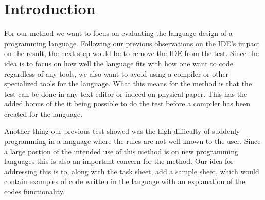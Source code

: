 \chapter{Introduction}
For our method we want to focus on evaluating the language design of a programming language.
Following our previous observations on the IDE's impact on the result, the next step would be to remove the IDE from the test.
Since the idea is to focus on how well the language fits with how one want to code regardless of any tools, we also want to avoid using a compiler or other specialized tools for the language.%
What this means for the method is that the test can be done in any text-editor or indeed on physical paper.
This has the added bonus of the it being possible to do the test before a compiler has been created for the language.

Another thing our previous test showed was the high difficulty of suddenly programming in a language where the rules are not well known to the user.
Since a large portion of the intended use of this method is on new programming languages this is also an important concern for the method.
Our idea for addressing this is to, along with the task sheet, add a sample sheet, which would contain examples of code written in the language with an explanation of the codes functionality.
